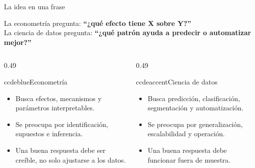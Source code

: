 \documentclass[aspectratio=169,11pt,table]{beamer}
\begin{document}
\begin{frame}{La idea en una frase}
\begin{keybox}
\centering
\large
La econometría pregunta: \textbf{``¿qué efecto tiene X sobre Y?''}\\[0.45em]
La ciencia de datos pregunta: \textbf{``¿qué patrón ayuda a predecir o automatizar mejor?''}
\end{keybox}

\vspace{0.22cm}
\begin{columns}[T,onlytextwidth]
\begin{column}{0.49\textwidth}
\begin{contrastbox}{ccdeblue}{Econometría}
\small
\begin{itemize}
  \item Busca efectos, mecanismos y parámetros interpretables.
  \item Se preocupa por identificación, supuestos e inferencia.
  \item Una buena respuesta debe ser creíble, no solo ajustarse a los datos.
\end{itemize}
\end{contrastbox}
\end{column}
\begin{column}{0.49\textwidth}
\begin{contrastbox}{ccdeaccent}{Ciencia de datos}
\small
\begin{itemize}
  \item Busca predicción, clasificación, segmentación y automatización.
  \item Se preocupa por generalización, escalabilidad y operación.
  \item Una buena respuesta debe funcionar fuera de muestra.
\end{itemize}
\end{contrastbox}
\end{column}
\end{columns}

\end{frame}
\end{document}
